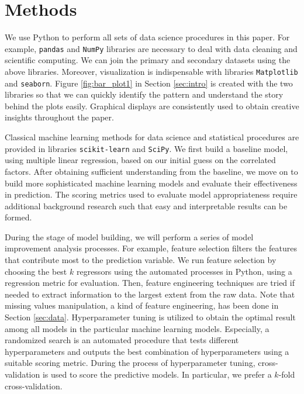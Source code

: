 \documentclass[11pt]{article}
\begin{document}
\section{Methods}\label{sec:methods}
We use Python to perform all sets of data science procedures in this paper. For example, \texttt{pandas} and \texttt{NumPy} libraries are necessary to deal with data cleaning and scientific computing. We can join the primary and secondary datasets using the above libraries. Moreover, visualization is indispensable with libraries \texttt{Matplotlib} and \texttt{seaborn}. Figure \ref{fig:bar_plot1} in Section \ref{sec:intro} is created with the two libraries so that we can quickly identify the pattern and understand the story behind the plots easily. Graphical displays are consistently used to obtain creative insights throughout the paper.

Classical machine learning methods for data science and statistical procedures are provided in libraries \texttt{scikit-learn} and \texttt{SciPy}. We first build a baseline model, using multiple linear regression, based on our initial guess on the correlated factors. After obtaining sufficient understanding from the baseline, we move on to build more sophisticated machine learning models and evaluate their effectiveness in prediction. The scoring metrics used to evaluate model appropriateness require additional background research such that easy and interpretable results can be formed.

During the stage of model building, we will perform a series of model improvement analysis processes. For example, feature selection filters the features that contribute most to the prediction variable. We run feature selection by choosing the best $k$ regressors using the automated processes in Python, using a regression metric for evaluation. Then, feature engineering techniques are tried if needed to extract information to the largest extent from the raw data. Note that missing values manipulation, a kind of feature engineering, has been done in Section \ref{sec:data}. Hyperparameter tuning is utilized to obtain the optimal result among all models in the particular machine learning models. Especially, a randomized search is an automated procedure that tests different hyperparameters and outputs the best combination of hyperparameters using a suitable scoring metric. During the process of hyperparameter tuning, cross-validation is used to score the predictive models. In particular, we prefer a $k$-fold cross-validation.
\end{document}

